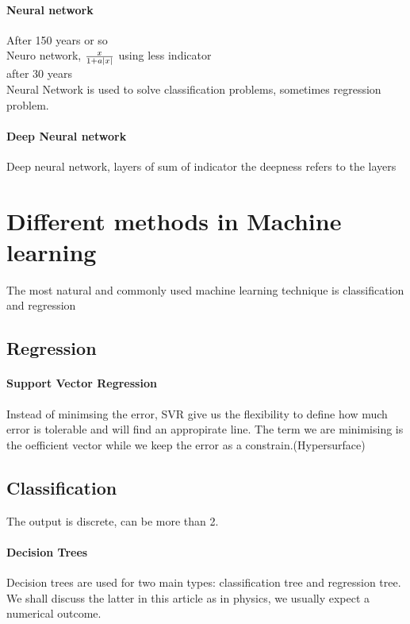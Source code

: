 \documentclass[12pt,a4paper]{article}
\begin{document}
\paragraph{Neural network}
After 150 years or so \\
Neuro network, $\frac{x}{1+a\abs{x}}$ using less indicator\\
after 30 years\\
Neural Network is used to solve classification problems, sometimes regression problem.

\paragraph{Deep Neural network}
Deep neural network, layers of sum of indicator
the deepness refers to the layers

\section{Different methods in Machine learning}
The most natural and commonly used machine learning technique is classification and regression

\subsection{Regression}
\paragraph{Support Vector Regression}
Instead of minimsing the error, SVR give us the flexibility to define how much error is tolerable and will find an appropirate line. The term we are minimising is the oefficient vector while we keep the error as a constrain.(Hypersurface)
\subsection{Classification}
The output is discrete, can be more than 2.
\paragraph{Decision Trees}

Decision trees are used for two main types: classification tree and regression tree. We shall discuss the latter in this article as in physics, we usually expect a numerical outcome.
\end{document}
